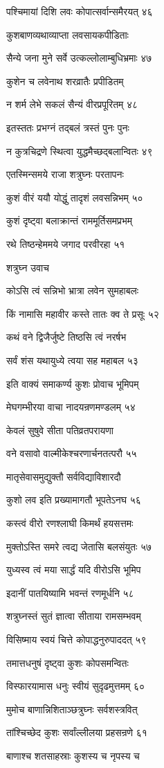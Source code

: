 पश्चिमायां दिशि लवः कोपात्सर्वान्समैरयत् ४६

कुशबाणव्यथाव्याप्ता लवसायकपीडिताः

सैन्ये जना मुने सर्वे उत्कल्लोलाम्बुधिभ्रमाः ४७

कुशेन च लवेनाथ शरव्रातैः प्रपीडितम्

न शर्म लेभे सकलं सैन्यं वीरप्रपूरितम् ४८

इतस्ततः प्रभग्नं तद्बलं त्रस्तं पुनः पुनः

न कुत्रचिद्रणे स्थित्वा युद्धमैच्छद्बलान्वितः ४९

एतस्मिन्समये राजा शत्रुघ्नः परतापनः

कुशं वीरं ययौ योद्धुं तादृशं लवसन्निभम् ५०

कुशं दृष्ट्वा बलाक्रान्तं राममूर्तिसमप्रभम्

रथे तिष्ठन्हेममये जगाद परवीरहा ५१

शत्रुघ्न उवाच

कोऽसि त्वं सन्निभो भ्रात्रा लवेन सुमहाबलः

किं नामासि महावीर कस्ते तातः क्व ते प्रसूः ५२

कथं वने द्विजैर्जुष्टे तिष्ठसि त्वं नरर्षभ

सर्वं शंस यथायुध्ये त्वया सह महाबल ५३

इति वाक्यं समाकर्ण्य कुशः प्रोवाच भूमिपम्

मेघगम्भीरया वाचा नादयन्रणमण्डलम् ५४

केवलं सुषुवे सीता पतिव्रतपरायणा

वने वसावो वाल्मीकेश्चरणार्चनतत्परौ ५५

मातृसेवासमुद्युक्तौ सर्वविद्याविशारदौ

कुशो लव इति प्रख्यामागतौ भूपतेऽनघ ५६

कस्त्वं वीरो रणश्लाघी किमर्थं हयसत्तमः

मुक्तोऽस्ति समरे त्वद्य जेतासि बलसंयुतः ५७

युध्यस्व त्वं मया सार्द्धं यदि वीरोऽसि भूमिप

इदानीं पातयिष्यामि भवन्तं रणमूर्धनि ५८

शत्रुघ्नस्तं सुतं ज्ञात्वा सीताया रामसम्भवम्

विसिष्माय स्वयं चित्ते कोपाद्धनुरुपाददत् ५९

तमात्तधनुषं दृष्ट्वा कुशः कोपसमन्वितः

विस्फारयामास धनुः स्वीयं सुदृढमुत्तमम् ६०

मुमोच बाणान्निशिताञ्छत्रुघ्नः सर्वशस्त्रवित्

तांश्चिच्छेद कुशः सर्वांल्लीलया प्रहसन्रणे ६१

बाणाश्च शतसाहस्राः कुशस्य च नृपस्य च

